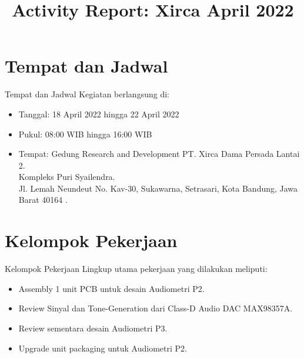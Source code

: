 \documentclass[table,dvipsnames]{beamer}
\title[Xirca042022]{Activity Report: Xirca April 2022}
\author{}
\institute[VibrasticLab : \ccbysa]{
	Achmadi ST MT
}
\date{}
\begin{document}
    \begin{frame}
        \titlepage
    \end{frame}

	\section{Tempat dan Jadwal}
	\begin{frame}
		\begin{exampleblock}{Tempat dan Jadwal}
			Kegiatan berlangsung di:
			\begin{itemize}
				\item Tanggal: 18 April 2022 hingga 22 April 2022
				\item Pukul: 08:00 WIB hingga 16:00 WIB
				\item Tempat: Gedung Research and Development PT. Xirca Dama Persada Lantai 2.\\
				Kompleks Puri Syailendra.\\
				Jl. Lemah Neundeut No. Kav-30, Sukawarna, Setrasari, Kota Bandung, Jawa Barat 40164 .
			\end{itemize}
		\end{exampleblock}
	\end{frame}
	
	\section{Kelompok Pekerjaan}
	\begin{frame}
	    \begin{exampleblock}{Kelompok Pekerjaan}
			Lingkup utama pekerjaan yang dilakukan meliputi:
			\begin{itemize}
				\item Assembly 1 unit PCB untuk desain Audiometri P2.
				\item Review Sinyal dan Tone-Generation dari Class-D Audio DAC MAX98357A.
				\item Review sementara desain Audiometri P3.
				\item Upgrade unit packaging untuk Audiometri P2.
			\end{itemize}
	    \end{exampleblock}
	\end{frame}
	
\end{document}
